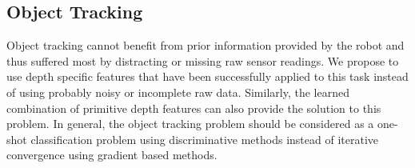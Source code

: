 \subsection{Object Tracking}

Object tracking cannot benefit from prior information provided by the robot and thus suffered most by distracting or missing raw sensor readings. We propose to use depth specific features that have been successfully applied to this task instead of using probably noisy or incomplete raw data. Similarly, the learned combination of primitive depth features can also provide the solution to this problem. In general, the object tracking problem should be considered as a one-shot classification problem using discriminative methods instead of iterative convergence using gradient based methods.
